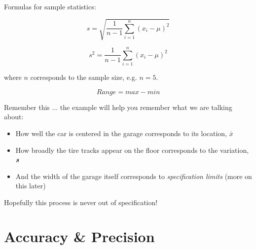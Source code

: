 Formulas for sample statistics:\\

\begin{center}
\begin{equation}
s = \sqrt{\frac{1}{n-1}\displaystyle\sum_{i=1}^{n}{\left( x_{i}-\mu\right)}^2 }
\end{equation}

\begin{equation}
s^{2} = {\frac{1}{n-1}\displaystyle\sum_{i=1}^{n}{\left( x_{i}-\mu\right)}^2 }
\end{equation}
\end{center}

where $ n $ corresponds to the sample size, e.g.  $ n = 5$.\\

\begin{center}
\begin{equation}
Range = max - min
\end{equation}

\end{center}
Remember this ... the example will help you remember what we are talking about:\\

  \begin{itemize}
  \item How well the car is centered in the garage corresponds to its location, $ \bar{x} $
  \item How broadly the tire tracks appear on the floor corresponds to the variation, \textbf{\textit{s}}
  \item And the width of the garage itself corresponds to  \textit{specification limits} (more on this later)
  \end{itemize}
Hopefully this process is never out of specification!

\section{Accuracy \& Precision}
